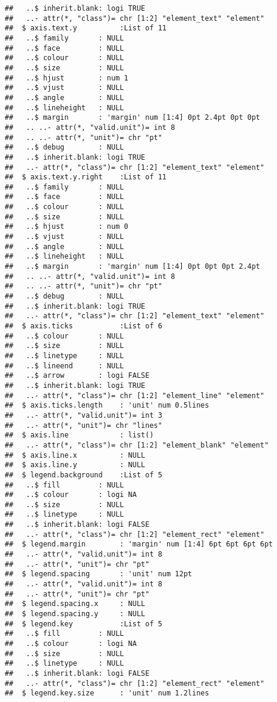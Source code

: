\documentclass[]{article}
\begin{document}
\begin{verbatim}
##   ..$ inherit.blank: logi TRUE
##   ..- attr(*, "class")= chr [1:2] "element_text" "element"
##  $ axis.text.y          :List of 11
##   ..$ family       : NULL
##   ..$ face         : NULL
##   ..$ colour       : NULL
##   ..$ size         : NULL
##   ..$ hjust        : num 1
##   ..$ vjust        : NULL
##   ..$ angle        : NULL
##   ..$ lineheight   : NULL
##   ..$ margin       : 'margin' num [1:4] 0pt 2.4pt 0pt 0pt
##   .. ..- attr(*, "valid.unit")= int 8
##   .. ..- attr(*, "unit")= chr "pt"
##   ..$ debug        : NULL
##   ..$ inherit.blank: logi TRUE
##   ..- attr(*, "class")= chr [1:2] "element_text" "element"
##  $ axis.text.y.right    :List of 11
##   ..$ family       : NULL
##   ..$ face         : NULL
##   ..$ colour       : NULL
##   ..$ size         : NULL
##   ..$ hjust        : num 0
##   ..$ vjust        : NULL
##   ..$ angle        : NULL
##   ..$ lineheight   : NULL
##   ..$ margin       : 'margin' num [1:4] 0pt 0pt 0pt 2.4pt
##   .. ..- attr(*, "valid.unit")= int 8
##   .. ..- attr(*, "unit")= chr "pt"
##   ..$ debug        : NULL
##   ..$ inherit.blank: logi TRUE
##   ..- attr(*, "class")= chr [1:2] "element_text" "element"
##  $ axis.ticks           :List of 6
##   ..$ colour       : NULL
##   ..$ size         : NULL
##   ..$ linetype     : NULL
##   ..$ lineend      : NULL
##   ..$ arrow        : logi FALSE
##   ..$ inherit.blank: logi TRUE
##   ..- attr(*, "class")= chr [1:2] "element_line" "element"
##  $ axis.ticks.length    : 'unit' num 0.5lines
##   ..- attr(*, "valid.unit")= int 3
##   ..- attr(*, "unit")= chr "lines"
##  $ axis.line            : list()
##   ..- attr(*, "class")= chr [1:2] "element_blank" "element"
##  $ axis.line.x          : NULL
##  $ axis.line.y          : NULL
##  $ legend.background    :List of 5
##   ..$ fill         : NULL
##   ..$ colour       : logi NA
##   ..$ size         : NULL
##   ..$ linetype     : NULL
##   ..$ inherit.blank: logi FALSE
##   ..- attr(*, "class")= chr [1:2] "element_rect" "element"
##  $ legend.margin        : 'margin' num [1:4] 6pt 6pt 6pt 6pt
##   ..- attr(*, "valid.unit")= int 8
##   ..- attr(*, "unit")= chr "pt"
##  $ legend.spacing       : 'unit' num 12pt
##   ..- attr(*, "valid.unit")= int 8
##   ..- attr(*, "unit")= chr "pt"
##  $ legend.spacing.x     : NULL
##  $ legend.spacing.y     : NULL
##  $ legend.key           :List of 5
##   ..$ fill         : NULL
##   ..$ colour       : logi NA
##   ..$ size         : NULL
##   ..$ linetype     : NULL
##   ..$ inherit.blank: logi FALSE
##   ..- attr(*, "class")= chr [1:2] "element_rect" "element"
##  $ legend.key.size      : 'unit' num 1.2lines

\end{verbatim}
\end{document}
